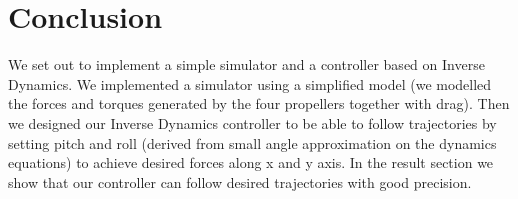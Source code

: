 \documentclass[12pt,fleqn]{article}
\begin{document}
\section{Conclusion}

We set out to implement a simple simulator and a controller based on
Inverse Dynamics. We implemented a simulator using a simplified model
(we modelled the forces and torques generated by the four propellers
together with drag). Then we designed our Inverse Dynamics controller
to be able to follow trajectories by setting pitch and roll (derived
from small angle approximation on the dynamics equations) to achieve
desired forces along x and y axis. In the result section we show that
our controller can follow desired trajectories with good precision.




\end{document}
